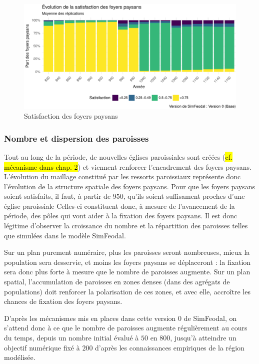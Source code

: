 \begin{figure}[H]
\captionsetup{width=\linewidth}
\includegraphics[width=0.95\linewidth]{img/resultats/v0_satisfaction_fp.pdf}
\caption{Satisfaction des foyers paysans}
\label{fig:satisfaction-fp-v0}
\end{figure}

\clearpage

\subsubsection{Nombre et dispersion des paroisses}

Tout au long de la période, de nouvelles églises paroissiales sont créées (\hl{cf. mécanisme dans chap. 2}) et viennent renforcer l'encadrement des foyers paysans.
L'évolution du maillage constitué par les ressorts paroissiaux représente donc l'évolution de la structure spatiale des foyers paysans.
Pour que les foyers paysans soient satisfaits, il faut, à partir de 950, qu'ils soient suffisament proches d'une église paroissiale
Celles-ci constituent donc, à mesure de l'avancement de la période, des pôles qui vont aider à la fixation des foyers paysans.
Il est donc légitime d'observer la croissance du nombre et la répartition des paroisses telles que simulées dans le modèle SimFeodal.

Sur un plan purement numéraire, plus les paroisses seront nombreuses, mieux la population sera desservie, et moins les foyers paysans se déplaceront : la fixation sera donc plus forte à mesure que le nombre de paroisses augmente.
Sur un plan spatial, l'accumulation de paroisses en zones denses (dans des agrégats de populations) doit renforcer la polarisation de ces zones, et avec elle, accroître les chances de fixation des foyers paysans.

D'après les mécanismes mis en places dans cette version 0 de SimFeodal, on s'attend donc à ce que le nombre de paroisses augmente régulièrement au cours du temps, depuis un nombre initial évalué à $50$ en $800$, jusqu'à atteindre un objectif numérique fixé à $200$ d'après les connaissances empiriques de la région modélisée.

